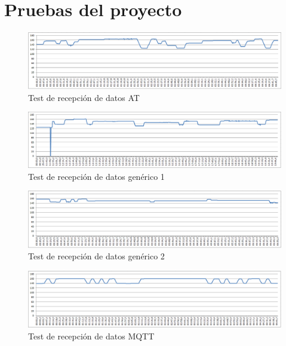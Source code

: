 \section{Pruebas del proyecto}\label{anexo:test}

\begin{figure}[H]
\centering
\includegraphics[width=1.1\textwidth]{figuras/trec1.png}
\caption{Test de recepción de datos AT}
\end{figure}

\begin{figure}[H]
\centering
\includegraphics[width=1.1\textwidth]{figuras/trec2.png}
\caption{Test de recepción de datos genérico 1}
\end{figure}

\begin{figure}[H]
\centering
\includegraphics[width=1.1\textwidth]{figuras/trec4.png}
\caption{Test de recepción de datos genérico 2}
\end{figure}

\begin{figure}[H]
\centering
\includegraphics[width=1.1\textwidth]{figuras/trec3.png}
\caption{Test de recepción de datos MQTT}
\end{figure}


